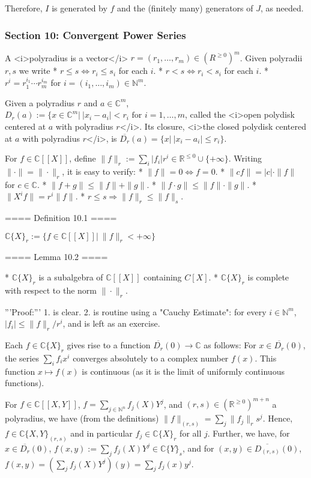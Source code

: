 Therefore, $I$ is generated by $f$ and the (finitely many) generators of $J$, as needed.

\subsubsection{ Section 10:  Convergent Power Series }

A <i>polyradius is a vector</i> $r = (r_1,\ldots, r_m)\in (R^{\geq 0})^m$.
Given polyradii $r,s$ we write
* $r\leq s \Leftrightarrow r_i \leq s_i$ for each $i$.
* $r < s \Leftrightarrow r_i < s_i$ for each $i$.
* $r^i = r_1^{i_1}\cdots r_m^{i_m}$ for $i = (i_1,\ldots, i_m)\in \mathbb{N}^m$.

Given a polyradius $r$ and $a\in \mathbb{C}^m$, $D_r(a):= \{x\in \mathbb{C}^m |\ |x_i - a_i| < r_i
\textrm{ for } i = 1,\ldots,m$, called the <i>open polydisk centered at $a$ with polyradius $r$</i>.
Its closure, <i>the closed polydisk centered at $a$ with polyradius $r$</i>, is $\overline{D_r}(a) = \{x | \ |x_i - a_i| \leq r_i\}$.

For $f\in \mathbb{C}[[X]]$, define $\|f\|_r := \sum_i |f_i| r^i \in \mathbb{R}^{\leq 0} \cup \{+\infty\}$.
Writing $\|\cdot \| = \|\cdot \|_r$, it is easy to verify:
* $\|f\| = 0 \Leftrightarrow f = 0$.
* $\|c f\| = |c| \cdot \|f\|$ for $c\in \mathbb{C}$.
* $\|f + g\| \leq \|f\| + \|g\|$.
* $\|f\cdot g\| \leq \|f\| \cdot \|g\|$.
* $\|X^i f\| = r^i \|f\|$.
* $r\leq s \Rightarrow \|f\|_r \leq \|f\|_s$.

==== Definition 10.1 ====

$\mathbb{C}\{X\}_r := \{f\in \mathbb{C}[[X]] |\ \|f\|_r < +\infty \}$

==== Lemma 10.2 ====

* $\mathbb{C} \{X\}_r$ is a subalgebra of $\mathbb{C}[[X]]$ containing $C[X]$.
* $\mathbb{C} \{X\}_r$ is complete with respect to the norm $\|\cdot\|_r$.

'''Proof:'''
1. is clear. 2. is routine using a "Cauchy Estimate": for every $i\in \mathbb{N}^m$, $|f_i|\leq \|f\|_r/r^i$,
and is left as an exercise.

Each $f\in\mathbb{C}\{X\}_r$ gives rise to a function $\overline{D_r}(0)\rightarrow\mathbb{C}$ as follows:
For $x\in\overline{D_r}(0)$, the series $\sum_i f_i x^i$ converges absolutely to a complex number $f(x)$.
This function $x\mapsto f(x)$ is continuous (as it is the limit of uniformly continuous functions).

For $f\in \mathbb{C}[[X,Y]]$, $f = \sum_{j\in \mathbb{N}^n} f_j(X) Y^j$, 
and $(r,s)\in (\mathbb{R}^{\geq 0})^{m+n}$ a polyradius, we have (from the definitions)
$\|f\|_{(r,s)} = \sum_j \|f_j\|_r s^j$.
Hence, $f\in \mathbb{C}\{X,Y\}_{(r,s)}$ and in particular $f_j\in \mathbb{C}\{X\}_r$ for all $j$.
Further, we have,
for $x\in \overline{D_r}(0)$, $f(x,y):= \sum_j f_j(X)Y^j\in \mathbb{C}\{Y\}_s$,
and for $(x,y)\in \overline{D_{(r,s)}}(0)$, $f(x,y) = \left( \sum_j f_j(X)Y^j\right)(y) = \sum_j f_j(x)y^j$.


